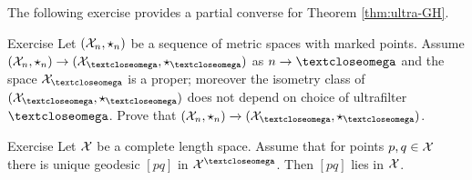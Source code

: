 The following exercise provides a partial converse for Theorem \ref{thm:ultra-GH}.

\begin{thm}{Exercise}
Let $(\mathcal{X}_n,\star_n)$ be a sequence of metric spaces with marked points.
Assume
$(\spc{X}_n,\star_n)\to(\spc{X}_\o,\star_\o)$
as $n\to \o$ and the space $\spc{X}_\o$ is a proper;
moreover the isometry class of $(\spc{X}_\o,\star_\o)$ does not depend on choice of ultrafilter $\o$.
Prove that $(\spc{X}_n,\star_n)\xto{}(\spc{X}_\o,\star_\o)$.
\end{thm}

\begin{thm}{Exercise}\label{ex:ultra-unique-geod}
Let $\mathcal{X}$ be a complete length space.
Assume that for points $p,q\in \spc{X}$ there is unique geodesic $[p q]$ in $\spc{X}^\o$.
Then $[p q]$ lies in $\mathcal{X}$.
\end{thm}

